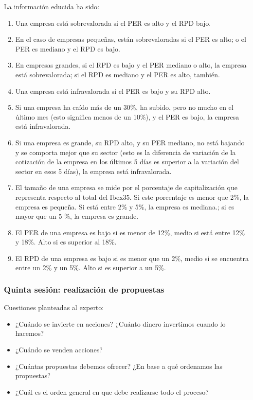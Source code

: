 \documentclass[a4paper,11pt]{article}
\begin{document}
La información educida ha sido: 
\begin{enumerate}[$\rightarrow$]
 \item Una empresa está sobrevalorada si el PER es alto y el RPD bajo.
 \item En el caso de empresas pequeñas, están sobrevaloradas si el PER es alto; o el PER es mediano y el RPD es bajo.
 \item En empresas grandes, si el RPD es bajo y el PER mediano o alto, la empresa está sobrevalorada; si el RPD es mediano
 y el PER es alto, también.
 \item Una empresa está infravalorada si el PER es bajo y su RPD alto.
 \item Si una empresa ha caído más de un 30\%, ha subido, pero no mucho en el último mes (esto significa menos de un 10\%),
 y el PER es bajo, la empresa está infravalorada.
 \item Si una empresa es grande, su RPD alto, y su PER mediano, no está bajando y se comporta mejor que su sector (esto es
 la diferencia de variación de la cotización de la empresa en los últimos 5 días es superior a la variación del sector en 
 esos 5 días), la empresa está infravalorada.
 \item El tamaño de una empresa se mide por el porcentaje de capitalización que representa respecto al total del Ibex35. Si
 este porcentaje es menor que 2\%, la empresa es pequeña. Si está entre 2\% y 5\%, la empresa es mediana.; si es mayor que 
 un 5 \%, la empresa es grande.
 \item El PER de una empresa es bajo si es menor de 12\%, medio si está entre 12\% y 18\%. Alto si es superior al 18\%.
 \item El RPD de una empresa es bajo si es menor que un 2\%, medio si se encuentra entre un 2\% y un 5\%. Alto si es superior
 a un 5\%.
\end{enumerate}

\subsubsection{Quinta sesión: realización de propuestas}

Cuestiones planteadas al experto:
\begin{itemize}
 \item ¿Cuándo se invierte en acciones? ¿Cuánto dinero invertimos cuando lo hacemos?
 \item ¿Cuándo se venden acciones?
 \item ¿Cuántas propuestas debemos ofrecer? ¿En base a qué ordenamos las propuestas?
 \item ¿Cuál es el orden general en que debe realizarse todo el proceso?
\end{itemize} 
\end{document}
